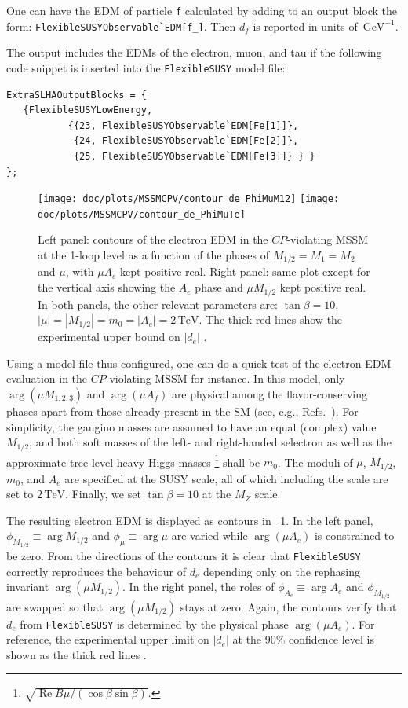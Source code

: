 \documentclass[final,3p,11pt,pdflatex]{elsarticle}
\makeatletter
\newcommand{\fs}{\texttt{FlexibleSUSY}\@\xspace}
\newcommand{\code}[1]{\lstinline|#1|}  %
\newcommand{\unit}[1]{\,\text{#1}}      %
\newcommand{\edm}[1]{\ensuremath{d_{#1}}\xspace}
\newcommand{\figref}[1]{\figurename~\ref{#1}}
\newcommand{\CP}{\ensuremath{CP}\xspace}
\newcommand{\mhalf}{\ensuremath{M_{1/2}}\xspace}
\newcommand{\mzero}{\ensuremath{m_0}\xspace}
\DeclareMathOperator{\re}{Re}
\makeatother
\begin{document}
One can have the EDM of particle \code{f} calculated
by adding to an output block the form: \code{FlexibleSUSYObservable`EDM[f_]}.
Then $\edm{f}$ is reported in units of $\unit{GeV}^{-1}$.
\begin{example}
The output includes
the EDMs of the electron, muon, and tau if
the following code snippet is inserted into the \fs model file:
\begin{lstlisting}
ExtraSLHAOutputBlocks = {
   {FlexibleSUSYLowEnergy,
           {{23, FlexibleSUSYObservable`EDM[Fe[1]]},
            {24, FlexibleSUSYObservable`EDM[Fe[2]]},
            {25, FlexibleSUSYObservable`EDM[Fe[3]]} } }
};
\end{lstlisting}
\end{example}

\begin{figure}
  \centering
  \texttt{[image: doc/plots/MSSMCPV/contour\_de\_PhiMuM12]}\hfill
  \texttt{[image: doc/plots/MSSMCPV/contour\_de\_PhiMuTe]}
  \caption{Left panel: contours of the electron EDM in the
    \CP-violating MSSM at the 1-loop level as a function of
    the phases of $\mhalf = M_1 = M_2$ and $\mu$,
    with $\mu A_e$ kept positive real.
    Right panel: same plot except for the vertical axis showing
    the $A_e$ phase and $\mu \mhalf$ kept positive real.
    In both panels, the other relevant parameters are:
    $\tan\beta = 10$, $|\mu| = |\mhalf| = \mzero = |A_e| = 2\unit{TeV}$.
    The thick red lines show the experimental upper bound on $|\edm{e}|$
    \cite{Baron:2013eja}.}
  \label{fig:EDM plots}
\end{figure}
Using a model file thus configured, one can do a quick test of
the electron EDM evaluation in the \CP-violating MSSM for instance.
In this model, only $\arg(\mu M_{1,2,3})$ and $\arg (\mu A_f)$ are
physical among the flavor-conserving phases
apart from those already present in the SM
(see, e.g., Refs.~\cite{Pokorski:1999hz,Stockinger:2006zn}).
For simplicity,
the gaugino masses are assumed to have an equal (complex) value
$\mhalf$, and both soft masses of the left- and right-handed
selectron as well as the approximate tree-level heavy Higgs masses%
\footnote{$\sqrt{\re\!B\mu / (\cos\!\beta \sin\!\beta)}$.}
shall be $\mzero$.
The moduli of $\mu$, $\mhalf$, $\mzero$, and $A_e$
are specified at the SUSY scale,
all of which including the scale are set to $2\unit{TeV}$.
Finally, we set $\tan\beta = 10$ at the $M_Z$ scale.

The resulting electron EDM is displayed as contours in
\figref{fig:EDM plots}.
In the left panel, $\phi_{\mhalf} \equiv \arg \mhalf$ and
$\phi_\mu \equiv \arg \mu$ are varied
while $\arg(\mu A_e)$ is constrained to be zero.
From the directions of the contours it is clear
that \fs correctly reproduces the behaviour of
$\edm{e}$ depending only on the rephasing invariant $\arg(\mu \mhalf)$.
In the right panel, the roles of $\phi_{A_e} \equiv \arg A_e$ and
$\phi_{\mhalf}$ are swapped so that $\arg(\mu \mhalf)$ stays at zero.
Again, the contours verify that
$\edm{e}$ from \fs is determined by the physical phase $\arg(\mu A_e)$.
For reference,
the experimental upper limit on $|\edm{e}|$ at the 90\% confidence level
is shown as the thick red lines \cite{Baron:2013eja}.
\end{document}

